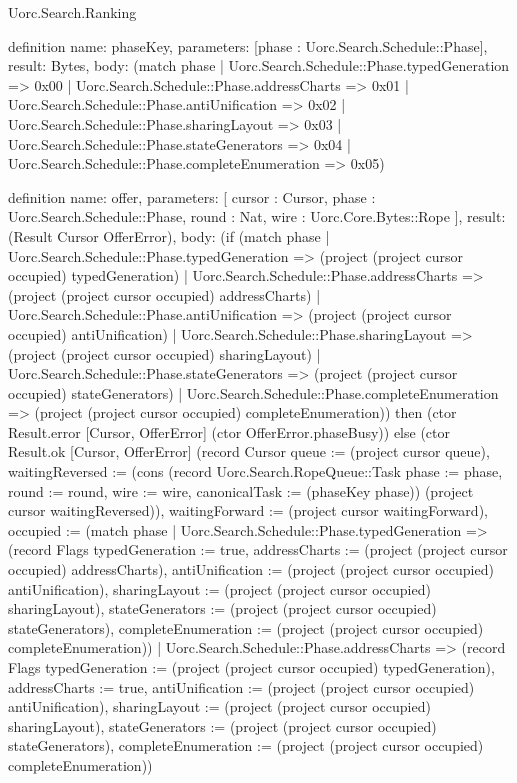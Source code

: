 \begin{lexlean}{Uorc.Search.Ranking}
\begin{semanticmodule}
definition{
  name: phaseKey,
  parameters: [phase : Uorc.Search.Schedule::Phase],
  result: Bytes,
  body: (match phase
    | Uorc.Search.Schedule::Phase.typedGeneration => 0x00
    | Uorc.Search.Schedule::Phase.addressCharts => 0x01
    | Uorc.Search.Schedule::Phase.antiUnification => 0x02
    | Uorc.Search.Schedule::Phase.sharingLayout => 0x03
    | Uorc.Search.Schedule::Phase.stateGenerators => 0x04
    | Uorc.Search.Schedule::Phase.completeEnumeration => 0x05)
}

definition{
  name: offer,
  parameters: [
    cursor : Cursor,
    phase : Uorc.Search.Schedule::Phase,
    round : Nat,
    wire : Uorc.Core.Bytes::Rope
  ],
  result: (Result Cursor OfferError),
  body: (if (match phase
    | Uorc.Search.Schedule::Phase.typedGeneration => (project (project cursor occupied) typedGeneration)
    | Uorc.Search.Schedule::Phase.addressCharts => (project (project cursor occupied) addressCharts)
    | Uorc.Search.Schedule::Phase.antiUnification => (project (project cursor occupied) antiUnification)
    | Uorc.Search.Schedule::Phase.sharingLayout => (project (project cursor occupied) sharingLayout)
    | Uorc.Search.Schedule::Phase.stateGenerators => (project (project cursor occupied) stateGenerators)
    | Uorc.Search.Schedule::Phase.completeEnumeration => (project (project cursor occupied) completeEnumeration)) then (ctor Result.error [Cursor, OfferError] (ctor OfferError.phaseBusy)) else (ctor Result.ok [Cursor, OfferError] (record Cursor {queue := (project cursor queue), waitingReversed := (cons (record Uorc.Search.RopeQueue::Task {phase := phase, round := round, wire := wire, canonicalTask := (phaseKey phase)}) (project cursor waitingReversed)), waitingForward := (project cursor waitingForward), occupied := (match phase
    | Uorc.Search.Schedule::Phase.typedGeneration => (record Flags {typedGeneration := true, addressCharts := (project (project cursor occupied) addressCharts), antiUnification := (project (project cursor occupied) antiUnification), sharingLayout := (project (project cursor occupied) sharingLayout), stateGenerators := (project (project cursor occupied) stateGenerators), completeEnumeration := (project (project cursor occupied) completeEnumeration)})
    | Uorc.Search.Schedule::Phase.addressCharts => (record Flags {typedGeneration := (project (project cursor occupied) typedGeneration), addressCharts := true, antiUnification := (project (project cursor occupied) antiUnification), sharingLayout := (project (project cursor occupied) sharingLayout), stateGenerators := (project (project cursor occupied) stateGenerators), completeEnumeration := (project (project cursor occupied) completeEnumeration)})
}}
\end{semanticmodule}
\end{lexlean}

